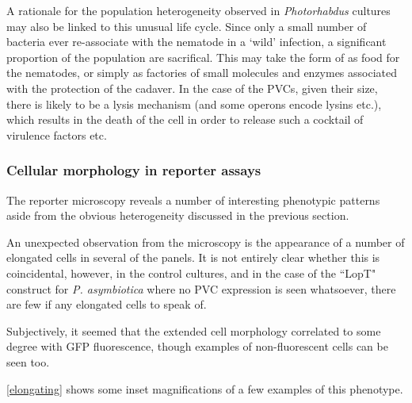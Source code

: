 A rationale for the population heterogeneity observed in \emph{Photorhabdus} cultures may also be linked to this unusual life cycle. Since only a small number of bacteria ever re-associate with the nematode in a `wild' infection, a significant proportion of the population are sacrifical. This may take the form of as food for the nematodes, or simply as factories of small molecules and enzymes associated with the protection of the cadaver. In the case of the PVCs, given their size, there is likely to be a lysis mechanism (and some operons encode lysins etc.), which results in the death of the cell in order to release such a cocktail of virulence factors etc.

\subsubsection{Cellular morphology in reporter assays}
The reporter microscopy reveals a number of interesting phenotypic patterns aside from the obvious heterogeneity discussed in the previous section.

An unexpected observation from the microscopy is the appearance of a number of elongated cells in several of the panels. It is not entirely clear whether this is coincidental, however, in the control cultures, and in the case of the ``LopT" construct for \emph{P. asymbiotica} where no PVC expression is seen whatsoever, there are few if any elongated cells to speak of.

Subjectively, it seemed that the extended cell morphology correlated to some degree with GFP fluorescence, though examples of non-fluorescent cells can be seen too.

\vref{elongating} shows some inset magnifications of a few examples of this phenotype.


